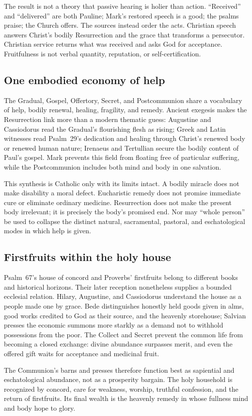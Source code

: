 The result is not a theory that passive hearing is holier than action.
``Received'' and ``delivered'' are both Pauline; Mark's restored speech is a
good; the psalms praise; the Church offers. The sources instead order the
acts. Christian speech answers Christ's bodily Resurrection and the grace
that transforms a persecutor. Christian service returns what was received and
asks God for acceptance. Fruitfulness is not verbal quantity, reputation, or
self-certification.

\subsection*{One embodied economy of help}

The Gradual, Gospel, Offertory, Secret, and Postcommunion share a vocabulary
of help, bodily renewal, healing, fragility, and remedy. Ancient exegesis
makes the Resurrection link more than a modern thematic guess: Augustine and
Cassiodorus read the Gradual's flourishing flesh as rising; Greek and Latin
witnesses read Psalm~29's dedication and healing through Christ's renewed
body or renewed human nature; Irenaeus and Tertullian secure the bodily
content of Paul's gospel. Mark prevents this field from floating free of
particular suffering, while the Postcommunion includes both mind and body in
one salvation.

This synthesis is Catholic only with its limits intact. A bodily miracle does
not make disability a moral defect. Eucharistic remedy does not promise
immediate cure or eliminate ordinary medicine. Resurrection does not make the
present body irrelevant; it is precisely the body's promised end. Nor may
``whole person'' be used to collapse the distinct natural, sacramental,
pastoral, and eschatological modes in which help is given.

\subsection*{Firstfruits within the holy house}

Psalm~67's house of concord and Proverbs' firstfruits belong to different
books and historical horizons. Their later reception nonetheless supplies a
bounded ecclesial relation. Hilary, Augustine, and Cassiodorus understand the
house as a people made one by grace. Bede distinguishes honestly held goods
given in alms, good works credited to God as their source, and the heavenly
storehouse; Salvian presses the economic summons more starkly as a demand not
to withhold possessions from the poor. The Collect and Secret prevent the common life from becoming a closed
exchange: divine abundance surpasses merit, and even the offered gift waits
for acceptance and medicinal fruit.

The Communion's barns and presses therefore function best as sapiential and
eschatological abundance, not as a prosperity bargain. The holy household is
recognized by concord, care for weakness, worship, truthful confession, and
the return of firstfruits. Its final wealth is the heavenly remedy in whose
fullness mind and body hope to glory.
